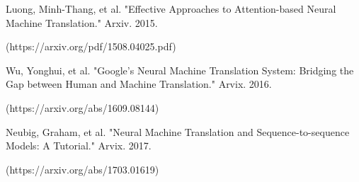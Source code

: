 \documentclass[10pt,a4paper]{article}
\begin{document}
Luong, Minh-Thang, et al. "Effective Approaches to Attention-based Neural Machine Translation." Arxiv. 2015.

(https://arxiv.org/pdf/1508.04025.pdf)
\newline

Wu, Yonghui, et al. "Google’s Neural Machine Translation System: Bridging the Gap between Human and Machine Translation." Arvix. 2016.

(https://arxiv.org/abs/1609.08144)
\newline

Neubig, Graham, et al. "Neural Machine Translation and Sequence-to-sequence Models: A Tutorial." Arvix. 2017.

(https://arxiv.org/abs/1703.01619)
\newline
\end{document}
